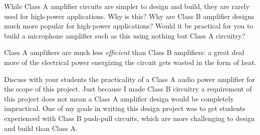 

While Class A amplifier circuits are simpler to design and build, they are rarely used for high-power applications.  Why is this?  Why are Class B amplifier designs much more popular for high-power applications?  Would it be practical for you to build a microphone amplifier such as this using nothing but Class A circuitry?







Class A amplifiers are much less {\it efficient} than Class B amplifiers: a great deal more of the electrical power energizing the circuit gets wasted in the form of heat.







Discuss with your students the practicality of a Class A audio power amplifier for the scope of this project.  Just because I made Class B circuitry a requirement of this project does not mean a Class A amplifier design would be completely impractical.  One of my goals in writing this design project was to get students experienced with Class B push-pull circuits, which are more challenging to design and build than Class A.



